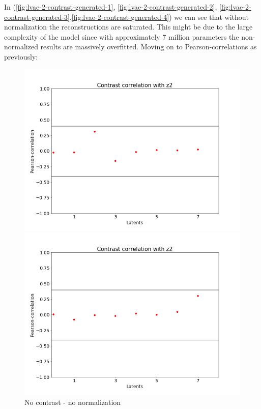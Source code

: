 \documentclass[12pt, english]{article}
\begin{document}
\par In (\ref{fig:lvae-2-contrast-generated-1}, \ref{fig:lvae-2-contrast-generated-2}, \ref{fig:lvae-2-contrast-generated-3},\ref{fig:lvae-2-contrast-generated-4}) we can see that without normalization the reconstructions are saturated. This might be due to the large complexity of the model since with approximately 7 million parameters the non-normalized results are massively overfitted. Moving on to Pearson-correlations as previously:

\vspace{4mm}

\begin{figure}[H] 
  \label{fig:contrast-correlation} 
  \begin{minipage}{0.5\linewidth}
    \centering
    \includegraphics[width=.72\linewidth]{lvae2/21_DenseLadderVAE_noNorm-contrast-to-z2-corr.png} 
    \caption{No contrast - no normalization} 
    \label{fig:lvae-2-no-contrast-no-norm}
  \end{minipage}%
  \begin{minipage}{0.5\linewidth}
    \centering
    \includegraphics[width=.72\linewidth]{lvae2/20_DenseLadderVAE_noNorm_contrat-contrast-to-z2-corr.png} 

\end{minipage}
\end{figure}
\end{document}
